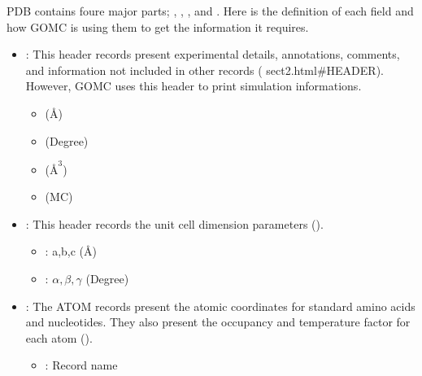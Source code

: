\documentclass[letterpaper,10pt,english]{sphinxmanual}
\begin{document}
PDB contains foure major parts; , , , and . Here is the definition of each field and how GOMC is using them to get the information it requires.
\begin{itemize}
\item {} 
:
This header records present experimental  details, annotations, comments, and information not included in other records ( sect2.html\#HEADER). However, GOMC uses this header to print simulation informations.
\begin{itemize}
\item {} 
 (Å)

\item {} 
 (Degree)

\item {} 
 (\(Å^3\))

\item {} 
 (MC)

\end{itemize}

\item {} 
:
This header records the unit cell dimension parameters ().
\begin{itemize}
\item {} 
: a,b,c (Å)

\item {} 
: \(\alpha, \beta, \gamma\) (Degree)

\end{itemize}

\item {} 
:
The ATOM records present the atomic coordinates for standard amino acids and nucleotides. They also present the occupancy and temperature factor for each atom ().
\begin{itemize}
\item {} 
: Record name


\end{itemize}
\end{itemize}
\end{document}
